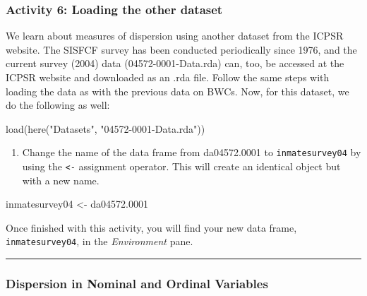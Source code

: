 \documentclass[
]{book}
\newenvironment{Shaded}{\begin{snugshade}}{\end{snugshade}}
\newcommand{\FloatTok}[1]{\textcolor[rgb]{0.00,0.00,0.81}{#1}}
\newcommand{\FunctionTok}[1]{\textcolor[rgb]{0.00,0.00,0.00}{#1}}
\newcommand{\NormalTok}[1]{#1}
\newcommand{\OtherTok}[1]{\textcolor[rgb]{0.56,0.35,0.01}{#1}}
\newcommand{\StringTok}[1]{\textcolor[rgb]{0.31,0.60,0.02}{#1}}
\providecommand{\tightlist}{%
  \setlength{\itemsep}{0pt}\setlength{\parskip}{0pt}}
\begin{document}
\hypertarget{activity-6-loading-the-other-dataset}{%
\subsubsection{Activity 6: Loading the other dataset}\label{activity-6-loading-the-other-dataset}}

We learn about measures of dispersion using another dataset from the ICPSR website. The SISFCF survey has been conducted periodically since 1976, and the current survey (2004) data (04572-0001-Data.rda) can, too, be accessed at the ICPSR website and downloaded as an .rda file. Follow the same steps with loading the data as with the previous data on BWCs. Now, for this dataset, we do the following as well:

\begin{Shaded}
\begin{Highlighting}[]
\FunctionTok{load}\NormalTok{(}\FunctionTok{here}\NormalTok{(}\StringTok{"Datasets"}\NormalTok{, }\StringTok{"04572{-}0001{-}Data.rda"}\NormalTok{))}
\end{Highlighting}
\end{Shaded}

\begin{enumerate}
\def\labelenumi{\arabic{enumi}.}
\tightlist
\item
  Change the name of the data frame from da04572.0001 to \texttt{inmatesurvey04} by using the \texttt{\textless{}-} assignment operator. This will create an identical object but with a new name.
\end{enumerate}

\begin{Shaded}
\begin{Highlighting}[]
\NormalTok{inmatesurvey04 }\OtherTok{\textless{}{-}}\NormalTok{ da04572}\FloatTok{.0001}
\end{Highlighting}
\end{Shaded}

Once finished with this activity, you will find your new data frame, \texttt{inmatesurvey04}, in the \emph{Environment} pane.

\begin{center}\rule{0.5\linewidth}{0.5pt}\end{center}

\hypertarget{dispersion-in-nominal-and-ordinal-variables}{%
\subsubsection{\texorpdfstring{\textbf{Dispersion in Nominal and Ordinal Variables}}{Dispersion in Nominal and Ordinal Variables}}\label{dispersion-in-nominal-and-ordinal-variables}}
\end{document}
